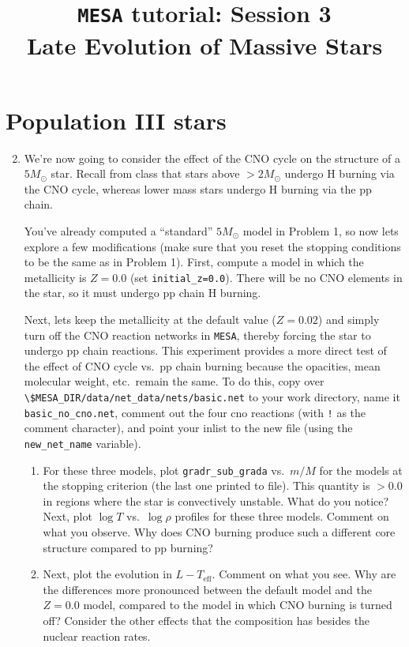 \documentclass[11pt,a4paper]{article}
\begin{document}
\title{
    \textbf{\texttt{MESA} tutorial:  Session 3} \\
    \textbf{\Large Late Evolution of Massive Stars}
}
\date{}
\maketitle
\vspace{-1cm}

\section{Population III stars}

\begin{enumerate}
  \setcounter{enumi}{1}
  \item We’re now going to consider the effect of the CNO cycle on the structure of a $5M_{\odot}$ star. Recall from class that stars above $> 2M_{\odot}$ undergo H burning via the CNO cycle, whereas lower mass stars undergo H burning via the pp chain. 

  You’ve already computed a ``standard'' $5M_{\odot}$ model in Problem 1, so now lets explore a few modifications (make sure that you reset the stopping conditions to be the same as in Problem 1). First, compute a model in which the metallicity is $Z=0.0$ (set \texttt{initial\_z=0.0}). There will be no CNO elements in the star, so it must undergo pp chain H burning.

  Next, lets keep the metallicity at the default value ($Z=0.02$) and simply turn off the CNO reaction networks in \texttt{MESA}, thereby forcing the star to undergo pp chain reactions. This experiment provides a more direct test of the effect of CNO cycle vs.\ pp chain burning because the opacities, mean molecular weight, etc.\ remain the same. To do this, copy over \verb|\$MESA_DIR/data/net_data/nets/basic.net| to your work directory, name it \texttt{basic\_no\_cno.net}, comment out the four cno reactions (with \texttt{!} as the comment character), and point your inlist to the new file (using the \texttt{new\_net\_name} variable).

  \begin{enumerate}
    \item For these three models, plot \texttt{gradr\_sub\_grada} vs.\ $m/M$ for the models at the stopping criterion (the last one printed to file). This quantity is $> 0.0$ in regions where the star is convectively unstable. What do you notice? Next, plot $\log T$ vs.\ $\log \rho$ profiles for these three models. Comment on what you observe. Why does CNO burning produce such a different core structure compared to pp burning?

    \item Next, plot the evolution in $L-T_{\mathrm{eff}}$. Comment on what you see. Why are the differences more pronounced between the default model and the $Z=0.0$ model, compared to the model in which CNO burning is turned off? Consider the other effects that the composition has besides the nuclear reaction rates. 
  \end{enumerate}
\end{enumerate}
\end{document}
